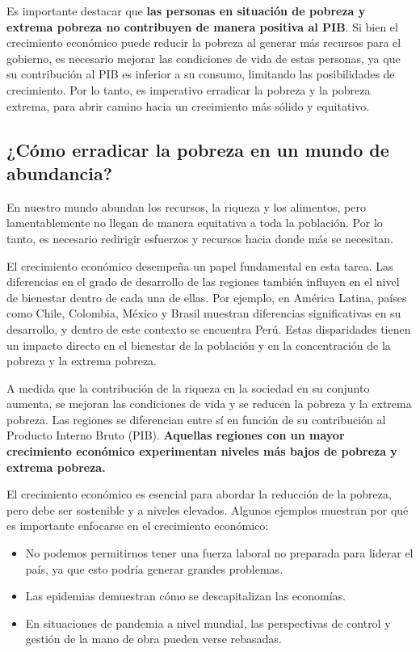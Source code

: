 \documentclass[
  a4paper,
]{article}
\providecommand{\tightlist}{%
  \setlength{\itemsep}{0pt}\setlength{\parskip}{0pt}}\usepackage{longtable,booktabs,array}
\begin{document}
Es importante destacar que \textbf{las personas en situación de pobreza
y extrema pobreza no contribuyen de manera positiva al PIB}. Si bien el
crecimiento económico puede reducir la pobreza al generar más recursos
para el gobierno, es necesario mejorar las condiciones de vida de estas
personas, ya que su contribución al PIB es inferior a su consumo,
limitando las posibilidades de crecimiento. Por lo tanto, es imperativo
erradicar la pobreza y la pobreza extrema, para abrir camino hacia un
crecimiento más sólido y equitativo.

\subsection{¿Cómo erradicar la pobreza en un mundo de
abundancia?}\label{cuxf3mo-erradicar-la-pobreza-en-un-mundo-de-abundancia}

En nuestro mundo abundan los recursos, la riqueza y los alimentos, pero
lamentablemente no llegan de manera equitativa a toda la población. Por
lo tanto, es necesario redirigir esfuerzos y recursos hacia donde más se
necesitan.

El crecimiento económico desempeña un papel fundamental en esta tarea.
Las diferencias en el grado de desarrollo de las regiones también
influyen en el nivel de bienestar dentro de cada una de ellas. Por
ejemplo, en América Latina, países como Chile, Colombia, México y Brasil
muestran diferencias significativas en su desarrollo, y dentro de este
contexto se encuentra Perú. Estas disparidades tienen un impacto directo
en el bienestar de la población y en la concentración de la pobreza y la
extrema pobreza.

A medida que la contribución de la riqueza en la sociedad en su conjunto
aumenta, se mejoran las condiciones de vida y se reducen la pobreza y la
extrema pobreza. Las regiones se diferencian entre sí en función de su
contribución al Producto Interno Bruto (PIB). \textbf{Aquellas regiones
con un mayor crecimiento económico experimentan niveles más bajos de
pobreza y extrema pobreza.}

El crecimiento económico es esencial para abordar la reducción de la
pobreza, pero debe ser sostenible y a niveles elevados. Algunos ejemplos
muestran por qué es importante enfocarse en el crecimiento económico:

\begin{itemize}
\tightlist
\item
  No podemos permitirnos tener una fuerza laboral no preparada para
  liderar el país, ya que esto podría generar grandes problemas.
\item
  Las epidemias demuestran cómo se descapitalizan las economías.
\item
  En situaciones de pandemia a nivel mundial, las perspectivas de
  control y gestión de la mano de obra pueden verse rebasadas.
\end{itemize}
\end{document}
